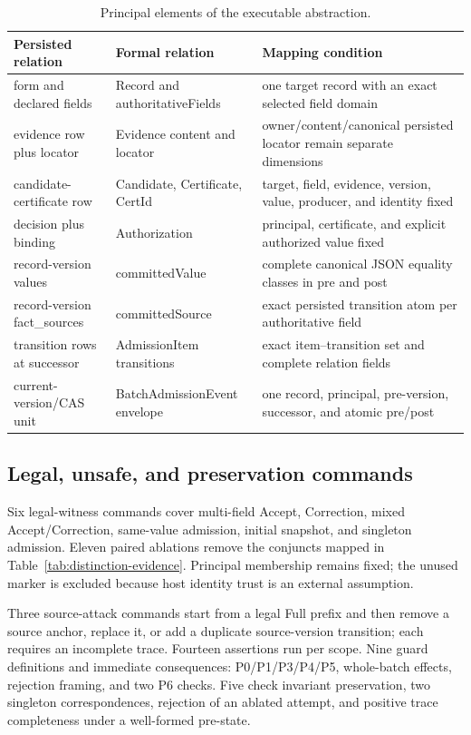 \begin{table}[t]
\centering
\caption{Principal elements of the executable abstraction.}
\label{tab:abstraction}
\begin{tabularx}{\textwidth}{@{}>{\raggedright\arraybackslash}p{}>{\raggedright\arraybackslash}p{}>{\raggedright\arraybackslash}X@{}}
\toprule
Persisted relation & Formal relation & Mapping condition \\
\midrule
form and declared fields & Record and authoritativeFields & one target record with an exact selected field domain \\
evidence row plus locator & Evidence content and locator & owner/content/canonical persisted locator remain separate dimensions \\
candidate-certificate row & Candidate, Certificate, CertId & target, field, evidence, version, value, producer, and identity fixed \\
decision plus binding & Authorization & principal, certificate, and explicit authorized value fixed \\
record-version values & committedValue & complete canonical JSON equality classes in pre and post \\
record-version fact\_sources & committedSource & exact persisted transition atom per authoritative field \\
transition rows at successor & AdmissionItem transitions & exact item--transition set and complete relation fields \\
current-version/CAS unit & BatchAdmissionEvent envelope & one record, principal, pre-version, successor, and atomic pre/post \\
\bottomrule
\end{tabularx}
\end{table}

\subsection{Legal, unsafe, and preservation commands}

Six legal-witness commands cover multi-field Accept, Correction, mixed Accept/Correction, same-value admission, initial snapshot, and singleton admission. Eleven paired ablations remove the conjuncts mapped in Table~\ref{tab:distinction-evidence}. Principal membership remains fixed; the unused  marker is excluded because host identity trust is an external assumption.

Three source-attack commands start from a legal Full prefix and then remove a source anchor, replace it, or add a duplicate source-version transition; each requires an incomplete trace. Fourteen assertions run per scope. Nine guard definitions and immediate consequences: P0/P1/P3/P4/P5, whole-batch effects, rejection framing, and two P6 checks. Five check invariant preservation, two singleton correspondences, rejection of an ablated attempt, and positive trace completeness under a well-formed pre-state.

